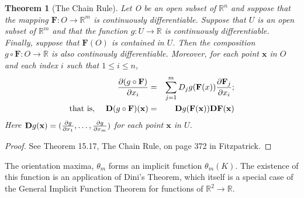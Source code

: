 \documentclass[11pt]{article} %
\newtheorem{theorem}{Theorem}
\newcommand{\compose}{\circ}
\begin{document}
\begin{theorem}[The Chain Rule]
Let O be an open subset of $ \mathbb{R}^n $ and suppose that the mapping $ \mathbf{F}:O \rightarrow \mathbb{R}^m $ is continuously differentiable. Suppose that $ U $ is an open subset of $ \mathbb{R}^m $ and that the function $ g:U \rightarrow \mathbb{R} $ is continuously differentiable. Finally, suppose that $ \mathbf{F}(O) $ is contained in $ U $. Then the composition $ g \compose \mathbf{F}:O \rightarrow \mathbb{R} $ is also continously differentiable. Moreover, for each point $ \mathbf{x} $ in $ O $ and each index $i $ such that $ 1 \leq i \leq n $,
\begin{eqnarray}
\pdv{(g \compose  \mathbf{F})}{x_i} ( \mathbf{x}) & = & \sum_{j=1}^{m} D_j g( \mathbf{F}(x)) \pdv{ \mathbf{F}_j}{x_i}(\mathbf{x}) ; \\
\mbox{that is, } \quad   \mathbf{D}(g \compose  \mathbf{F})(\mathbf{x}) & = & \mathbf{D}g( \mathbf{F}(\mathbf{x}))\mathbf{D} \mathbf{F}(\mathbf{x})
\end{eqnarray}
Here $ \mathbf{D}g(\mathbf{x}) = (\pdv{g}{x_1}, \hdots , \pdv{g}{x_m}) $ for each point $ \mathbf{x} $  in $ U $.
\end{theorem}
\begin{proof}
See Theorem 15.17, The Chain Rule, on page 372 in Fitzpatrick.
\end{proof}

The orientation maxima, $ \theta_m $ forms an implicit function $ \theta_m(K) $. The existence of this function is an application of Dini's Theorem, which itself is a special case of the General Implicit Function Theorem for functions of  $ \mathbb{R}^2 \rightarrow \mathbb{R} $. 
\end{document}
